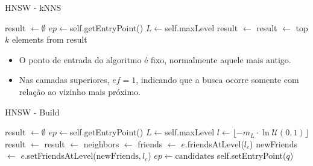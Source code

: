\documentclass[11pt]{beamer}
\makeatletter
\renewcommand{\ALG@beginalgorithmic}{\small}
\makeatother
\begin{document}
\begin{frame}{HNSW - kNNS}

\begin{algorithm}[H]
\caption{HNSW kNNS}\label{alg:HNSW-kNNS}
\begin{algorithmic}[1]
\State result $\gets \emptyset$
\State $ep \gets$self.getEntryPoint()
\State $L \gets$self.maxLevel
    \State result $\gets$ 
\EndFor
\State result $\gets$  
\State \Return top $k$ elements from result
\EndProcedure
\end{algorithmic}
\end{algorithm}

\begin{itemize}
    \item O ponto de entrada do algoritmo é fixo, normalmente aquele mais antigo.
    \item Nas camadas superiores, $ef=1$, indicando que a busca ocorre somente com relação ao vizinho mais próximo.
\end{itemize}

\end{frame}

\makeatletter
\renewcommand{\ALG@beginalgorithmic}{\scriptsize}
\makeatother

\begin{frame}{HNSW - Build}
\begin{algorithm}[H]
\caption{HNSW Build}\label{alg:HNSW-build}
\begin{algorithmic}[1]
\State result $\gets \emptyset$
\State $ep \gets$self.getEntryPoint()
\State $L \gets$self.maxLevel
\State $l\gets \lfloor-m_L\cdot \ln\mathcal{U}(0,1)\rfloor$
    \State result $\gets$ 
\EndFor
{}
\State result $\gets$  
\State neighbors $\gets$  
\State {}
\State friends $\gets$ $e$.friendsAtLevel($l_c$)
\State newFriends $\gets$ 
\State $e$.setFriendsAtLevel($\text{newFriends}, l_c$)
\EndIf
\EndFor
\State $ep \gets \text{candidates}$
\EndFor
{} self.setEntryPoint($q$)
\EndIf
\EndProcedure
\end{algorithmic}
\end{algorithm}
\end{frame}
\end{document}
